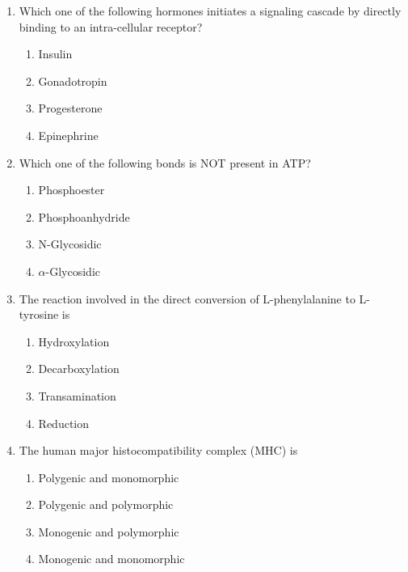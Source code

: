 \documentclass[journal,12pt,onecolumn]{IEEEtran}
\begin{document}
\begin{enumerate}[label=\arabic*.]

\item Which one of the following hormones initiates a signaling cascade by directly binding to an intra-cellular receptor?
\begin{multicols}{2}
\begin{enumerate}[label=(\Alph*)]
    \item Insulin
    \item Gonadotropin
    \item Progesterone
    \item Epinephrine
\end{enumerate}
\end{multicols}

\item Which one of the following bonds is NOT present in ATP?
\begin{multicols}{2}
\begin{enumerate}[label=(\Alph*)]
    \item Phosphoester
    \item Phosphoanhydride
    \item N-Glycosidic
    \item $\alpha$-Glycosidic
\end{enumerate}
\end{multicols}

\item The reaction involved in the direct conversion of L-phenylalanine to L-tyrosine is
\begin{multicols}{2}
\begin{enumerate}[label=(\Alph*)]
    \item Hydroxylation
    \item Decarboxylation
    \item Transamination
    \item Reduction
\end{enumerate}
\end{multicols}

\item The human major histocompatibility complex (MHC) is
\begin{multicols}{2}
\begin{enumerate}[label=(\Alph*)]
    \item Polygenic and monomorphic
    \item Polygenic and polymorphic
    \item Monogenic and polymorphic
    \item Monogenic and monomorphic
\end{enumerate}
\end{multicols}


\end{enumerate}
\end{document}

